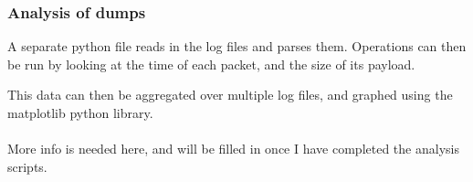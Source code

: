 \documentclass{sig-alternate-05-2015}
\begin{document}
\subsubsection{Analysis of dumps}
A separate python file reads in the log files and parses them. Operations can then be run by looking at the time of each packet, and the size of its payload. 

This data can then be aggregated over multiple log files, and graphed using the matplotlib python library.\\\\
More info is needed here, and will be filled in once I have completed the analysis scripts.


 
\end{document}

